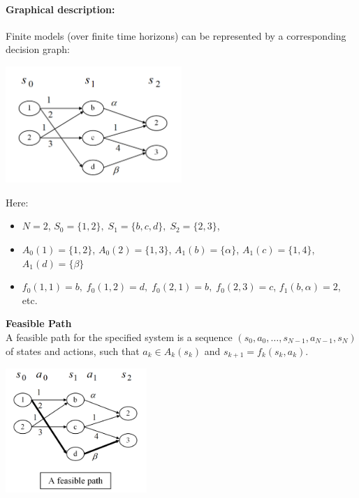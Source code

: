 \paragraph{Graphical description:} Finite models (over finite time horizons) can be represented by a corresponding decision graph:

\begin{centering}
\includegraphics[width=0.5\textwidth]{lecture2_decision_graph}\\
\end{centering}

Here:
\begin{itemize}
  \item $N = 2$, ${S_0} = \{ 1,2\} ,\;{S_1} = \{ b,c,d\} ,\;{S_2} = \{ 2,3\} $,
  \item ${A_0}(1) = \{ 1,2\} $, ${A_0}(2) = \{ 1,3\} $, ${A_1}(b) = \{ \alpha \} $, ${A_1}(c) = \{ 1,4\} $, ${A_1}(d) = \{ \beta \} $
  \item ${f_0}(1,1) = b,\;{f_0}(1,2) = d,\;{f_0}(2,1) = b,\;{f_0}(2,3) = c$, ${f_1}(b,\alpha ) = 2$, etc.
\end{itemize}

\begin{definition}{\textbf{Feasible Path}} \\
A feasible path for the specified system is a sequence $({s_0},{a_0}, \ldots ,{s_{N - 1}},{a_{N - 1}},{s_N})$ of states and actions, such that ${a_k} \in {A_k}({s_k})$ and ${s_{k + 1}} = {f_k}({s_k},{a_k})$.

\vspace{10pt}
\begin{centering}
\includegraphics[width=0.4\textwidth]{lecture2_feasible_path}\\
\end{centering}
\end{definition}

